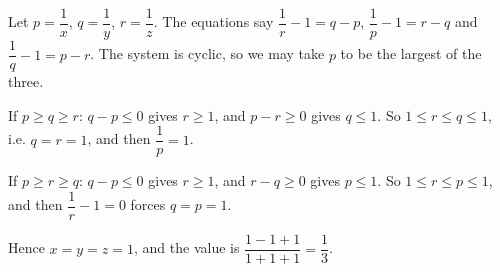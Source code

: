 Let $p=\dfrac1x$, $q=\dfrac1y$, $r=\dfrac1z$. The equations say $\dfrac1r-1=q-p$, $\dfrac1p-1=r-q$ and $\dfrac1q-1=p-r$. The system is cyclic, so we may take $p$ to be the largest of the three.

If $p\ge q\ge r$: $q-p\le0$ gives $r\ge1$, and $p-r\ge0$ gives $q\le1$. So $1\le r\le q\le1$, i.e. $q=r=1$, and then $\dfrac1p=1$.

If $p\ge r\ge q$: $q-p\le0$ gives $r\ge1$, and $r-q\ge0$ gives $p\le1$. So $1\le r\le p\le1$, and then $\dfrac1r-1=0$ forces $q=p=1$.

Hence $x=y=z=1$, and the value is $\dfrac{1-1+1}{1+1+1}=\boxed{\dfrac13}$.
